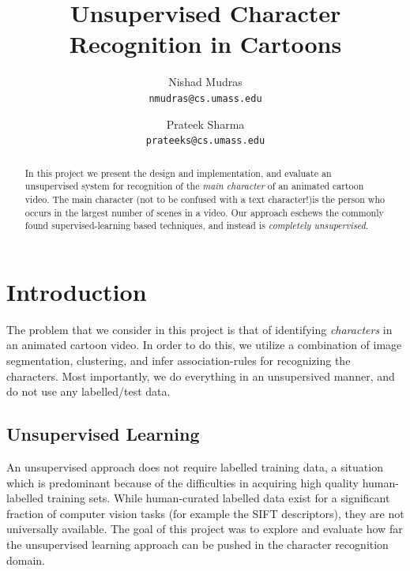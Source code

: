 \documentclass[10pt,twocolumn,letterpaper]{article}
\begin{document}
\title{Unsupervised Character Recognition in Cartoons}

\author{Nishad Mudras \\
{\tt\small nmudras@cs.umass.edu}
\and
Prateek Sharma \\
{\tt\small prateeks@cs.umass.edu}
}

\maketitle

\begin{abstract}

In this project we present the design and implementation, and evaluate
an unsupervised system for recognition of the \emph{main character} of
an animated cartoon video. The main character (not to be confused with a
text character!)is the person who occurs in the largest number of
scenes in a video. Our approach eschews the commonly found
supervised-learning based techniques, and instead is \emph{completely
  unsupervised}.

\end{abstract}

\section{Introduction}

The problem that we consider in this project is that of identifying
\emph{characters} in an animated cartoon video. In order to do this,
we utilize a combination of image segmentation, clustering, and infer
association-rules for recognizing the characters. Most importantly, we
do everything in an unsupersived manner, and do not use any
labelled/test data. 


\subsection{Unsupervised Learning}

An unsupervised approach does not require labelled training data, a
situation which is predominant because of the difficulties in
acquiring high quality human-labelled training sets. While
human-curated labelled data exist for a significant fraction of
computer vision tasks (for example the SIFT descriptors), they are not
universally available. The goal of this project was to explore and
evaluate how far the unsupervised learning approach can be pushed in
the character recognition domain.
\end{document}
